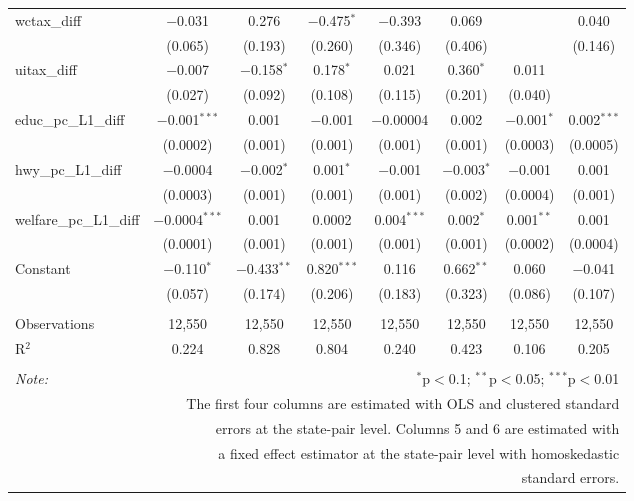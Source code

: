\begin{table}[!htbp]
\begin{tabular}{@{\extracolsep{5pt}}lccccccc}
  wctax\_diff & $-$0.031 & 0.276 & $-$0.475$^{*}$ & $-$0.393 & 0.069 &  & 0.040 \\ 
  & (0.065) & (0.193) & (0.260) & (0.346) & (0.406) &  & (0.146) \\ 
  uitax\_diff & $-$0.007 & $-$0.158$^{*}$ & 0.178$^{*}$ & 0.021 & 0.360$^{*}$ & 0.011 &  \\ 
  & (0.027) & (0.092) & (0.108) & (0.115) & (0.201) & (0.040) &  \\ 
  educ\_pc\_L1\_diff & $-$0.001$^{***}$ & 0.001 & $-$0.001 & $-$0.00004 & 0.002 & $-$0.001$^{*}$ & 0.002$^{***}$ \\ 
  & (0.0002) & (0.001) & (0.001) & (0.001) & (0.001) & (0.0003) & (0.0005) \\ 
  hwy\_pc\_L1\_diff & $-$0.0004 & $-$0.002$^{*}$ & 0.001$^{*}$ & $-$0.001 & $-$0.003$^{*}$ & $-$0.001 & 0.001 \\ 
  & (0.0003) & (0.001) & (0.001) & (0.001) & (0.002) & (0.0004) & (0.001) \\ 
  welfare\_pc\_L1\_diff & $-$0.0004$^{***}$ & 0.001 & 0.0002 & 0.004$^{***}$ & 0.002$^{*}$ & 0.001$^{**}$ & 0.001 \\ 
  & (0.0001) & (0.001) & (0.001) & (0.001) & (0.001) & (0.0002) & (0.0004) \\ 
  Constant & $-$0.110$^{*}$ & $-$0.433$^{**}$ & 0.820$^{***}$ & 0.116 & 0.662$^{**}$ & 0.060 & $-$0.041 \\ 
  & (0.057) & (0.174) & (0.206) & (0.183) & (0.323) & (0.086) & (0.107) \\ 
 \hline \\[-1.8ex] 
Observations & 12,550 & 12,550 & 12,550 & 12,550 & 12,550 & 12,550 & 12,550 \\ 
R$^{2}$ & 0.224 & 0.828 & 0.804 & 0.240 & 0.423 & 0.106 & 0.205 \\ 
\hline 
\hline \\[-1.8ex] 
\textit{Note:}  & \multicolumn{7}{r}{$^{*}$p$<$0.1; $^{**}$p$<$0.05; $^{***}$p$<$0.01} \\ 
 & \multicolumn{7}{r}{The first four columns are estimated with OLS and clustered standard} \\ 
 & \multicolumn{7}{r}{ errors at the state-pair level. Columns 5 and 6 are estimated with} \\ 
 & \multicolumn{7}{r}{a fixed effect estimator at the state-pair level with homoskedastic} \\ 
 & \multicolumn{7}{r}{standard errors.} \\ 
\end{tabular} 
\end{table} 
